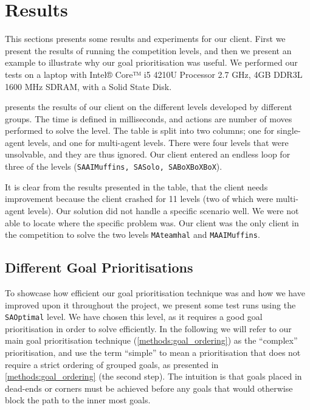 \section{Results}
\label{sec:results}


This sections presents some results and experiments for our client.
First we present the results of running the competition levels, and then we present an example to illustrate why our goal prioritisation was useful.
We performed our tests on a laptop with Intel® Core™ i5 4210U Processor 2.7 GHz, 4GB DDR3L 1600 MHz SDRAM, with a Solid State Disk.

 presents the results of our client on the different levels developed by different groups.
The time is defined in milliseconds, and actions are number of moves performed to solve the level.
The table is split into two columns; one for single-agent levels, and one for multi-agent levels.
There were four levels that were unsolvable, and they are thus ignored.
Our client entered an endless loop for three of the levels (\texttt{SAAIMuffins, SASolo, SABoXBoXBoX}).

It is clear from the results presented in the table, that the client needs improvement because the client crashed for 11 levels (two of which were multi-agent levels).
Our solution did not handle a specific scenario well.
We were not able to locate where the specific problem was.
Our client was the only client in the competition to solve the two levels \texttt{MAteamhal} and \texttt{MAAIMuffins}.



\subsection{Different Goal Prioritisations}

To showcase how efficient our goal prioritisation technique was and how we have improved upon it throughout the project, we present some test runs using the \texttt{SAOptimal} level.
We have chosen this level, as it requires a good goal prioritisation in order to solve efficiently.
In the following we will refer to our main goal prioritisation technique (\cref{methods:goal_ordering}) as the ``complex'' prioritisation, and use the term ``simple'' to mean a prioritisation that does not require a strict ordering of grouped goals, as presented in \cref{methods:goal_ordering} (the second step).
The intuition is that goals placed in dead-ends or corners must be achieved before any goals that would otherwise block the path to the inner most goals.

